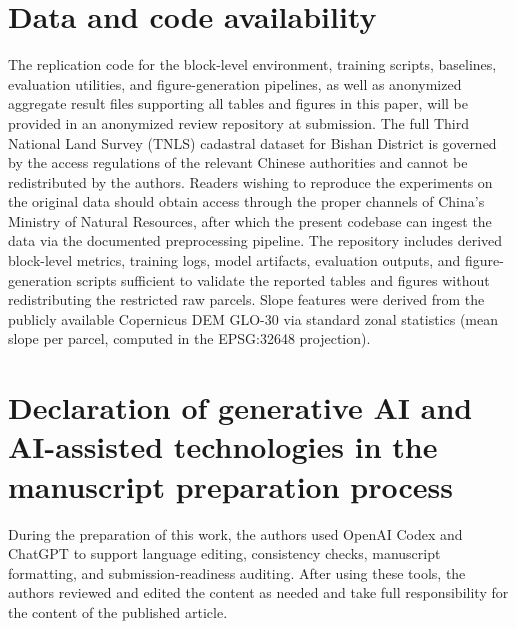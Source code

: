 \documentclass[preprint,12pt]{elsarticle}
\begin{document}
\section*{Data and code availability}
The replication code for the block-level environment, training scripts, baselines, evaluation utilities, and figure-generation pipelines, as well as anonymized aggregate result files supporting all tables and figures in this paper, will be provided in an anonymized review repository at submission. The full Third National Land Survey (TNLS) cadastral dataset for Bishan District is governed by the access regulations of the relevant Chinese authorities and cannot be redistributed by the authors. Readers wishing to reproduce the experiments on the original data should obtain access through the proper channels of China's Ministry of Natural Resources, after which the present codebase can ingest the data via the documented preprocessing pipeline. The repository includes derived block-level metrics, training logs, model artifacts, evaluation outputs, and figure-generation scripts sufficient to validate the reported tables and figures without redistributing the restricted raw parcels. Slope features were derived from the publicly available Copernicus DEM GLO-30 \citep{copernicus2021dem} via standard zonal statistics (mean slope per parcel, computed in the EPSG:32648 projection).

\section*{Declaration of generative AI and AI-assisted technologies in the manuscript preparation process}
During the preparation of this work, the authors used OpenAI Codex and ChatGPT to support language editing, consistency checks, manuscript formatting, and submission-readiness auditing. After using these tools, the authors reviewed and edited the content as needed and take full responsibility for the content of the published article.


\end{document}
